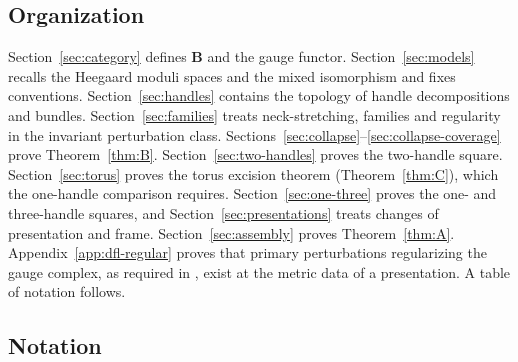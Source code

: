 \documentclass[11pt]{amsart}
\theoremstyle{definition}
\theoremstyle{remark}
\theoremstyle{plain}
\numberwithin{equation}{section}
\newcommand{\bB}{\mathbf{B}}
\begin{document}
\subsection*{Organization}

Section~\ref{sec:category} defines $\bB$ and the gauge functor.
Section~\ref{sec:models} recalls the Heegaard moduli spaces and the mixed
isomorphism and fixes conventions. Section~\ref{sec:handles} contains the
topology of handle decompositions and bundles. Section~\ref{sec:families}
treats neck-stretching, families and regularity in the invariant
perturbation class. Sections~\ref{sec:collapse}--\ref{sec:collapse-coverage}
prove Theorem~\ref{thm:B}. Section~\ref{sec:two-handles} proves the two-handle square.
Section~\ref{sec:torus} proves the torus excision theorem (Theorem~\ref{thm:C}),
which the one-handle comparison requires. Section~\ref{sec:one-three} proves
the one- and three-handle squares, and Section~\ref{sec:presentations} treats
changes of presentation and frame. Section~\ref{sec:assembly} proves
Theorem~\ref{thm:A}. Appendix~\ref{app:dfl-regular} proves that primary
perturbations regularizing the gauge complex, as required in \cite{DFL},
exist at the metric data of a presentation. A table of notation follows.

\subsection*{Notation}
\end{document}
